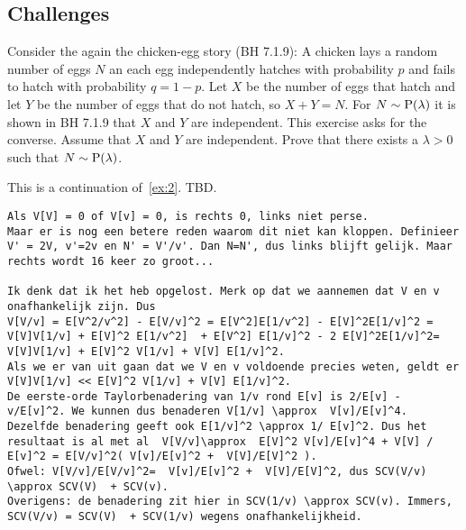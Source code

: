 \documentclass[assignments]{subfiles}
\begin{document}
\subsection{Challenges}
\label{sec:above-exam-level}

\begin{exercise} %
Consider the again the chicken-egg story (BH 7.1.9): A chicken lays a random number of eggs $N$ an each egg independently hatches with probability $p$ and fails to hatch with probability $q = 1-p$. Let $X$ be the number of eggs that hatch and let $Y$ be the number of eggs that do not hatch, so $X+Y = N$. 
For $N \sim \mathrm{P}(\lambda)$ it is shown in BH 7.1.9 that $X$ and $Y$ are independent. This exercise asks for the converse. Assume that $X$ and $Y$ are independent. Prove that there exists a $\lambda > 0$ such that $N \sim \mathrm{P}(\lambda)$.
\end{exercise}


\begin{exercise}\label{ex:3}
This is a continuation of~\cref{ex:2}.  TBD.
 
\begin{verbatim}
Als V[V] = 0 of V[v] = 0, is rechts 0, links niet perse.
Maar er is nog een betere reden waarom dit niet kan kloppen. Definieer V' = 2V, v'=2v en N' = V'/v'. Dan N=N', dus links blijft gelijk. Maar rechts wordt 16 keer zo groot...

Ik denk dat ik het heb opgelost. Merk op dat we aannemen dat V en v onafhankelijk zijn. Dus
V[V/v] = E[V^2/v^2] - E[V/v]^2 = E[V^2]E[1/v^2] - E[V]^2E[1/v]^2 = V[V]V[1/v] + E[V]^2 E[1/v^2]  + E[V^2] E[1/v]^2 - 2 E[V]^2E[1/v]^2= V[V]V[1/v] + E[V]^2 V[1/v] + V[V] E[1/v]^2.
Als we er van uit gaan dat we V en v voldoende precies weten, geldt er V[V]V[1/v] << E[V]^2 V[1/v] + V[V] E[1/v]^2.
De eerste-orde Taylorbenadering van 1/v rond E[v] is 2/E[v] - v/E[v]^2. We kunnen dus benaderen V[1/v] \approx  V[v]/E[v]^4.
Dezelfde benadering geeft ook E[1/v]^2 \approx 1/ E[v]^2. Dus het resultaat is al met al  V[V/v]\approx  E[V]^2 V[v]/E[v]^4 + V[V] / E[v]^2 = E[V/v]^2( V[v]/E[v]^2 +  V[V]/E[V]^2 ).
Ofwel: V[V/v]/E[V/v]^2=  V[v]/E[v]^2 +  V[V]/E[V]^2, dus SCV(V/v) \approx SCV(V)  + SCV(v).
Overigens: de benadering zit hier in SCV(1/v) \approx SCV(v). Immers, SCV(V/v) = SCV(V)  + SCV(1/v) wegens onafhankelijkheid. 

\end{verbatim}

\end{exercise}
\end{document}
